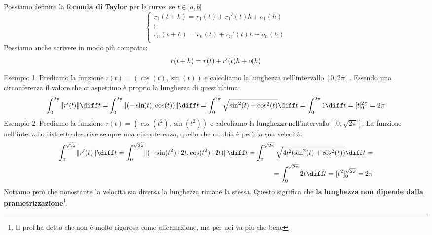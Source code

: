 
Possiamo definire la \textbf{formula di Taylor} per le curve: se $t \in ]a, b[$
\begin{equation*}
	\begin{cases}
		r_1(t + h) = r_1(t) + r_1'(t)h + o_1(h)\\
		\vdots\\
		r_n(t + h) = r_n(t) + r_n'(t)h + o_n(h)\\
	\end{cases}
\end{equation*}
Possiamo anche scrivere in modo più compatto:
\begin{equation*}
	r(t + h) = r(t) + r'(t)h + o(h)\\
\end{equation*}

Esempio 1: Prediamo la funzione $r(t) = (\cos(t), \sin(t))$ e calcoliamo la lunghezza nell'intervallo $[0, 2\pi]$. Essendo una circonferenza il valore che ci aspettimo è proprio la lunghezza di quest'ultima:
\begin{equation*}
	\int_0^{2\pi} \lVert r'(t) \rVert \diff t = \int_0^{2\pi} \lVert (-\sin(t), \cos(t)) \rVert \diff t = \int_0^{2\pi} \sqrt{\sin^2(t) + \cos^2(t)} \diff t = \int_0^{2\pi} 1 \diff t =  [t]_0^{2\pi} = 2\pi
\end{equation*}
Esempio 2: Prediamo la funzione $r(t) = (\cos(t^2), \sin(t^2))$ e calcoliamo la lunghezza nell'intervallo $[0, \sqrt{2\pi}]$. La funzione nell'intervallo ristretto descrive sempre una circonferenza, quello che cambia è però la sua velocità:
\begin{align*}
	\int_0^{\sqrt{2\pi}} \lVert r'(t) \rVert \diff t = \int_0^{\sqrt{2\pi}} \lVert (-\sin(t^2) \cdot 2t, \cos(t^2) \cdot 2t) \rVert \diff t = \int_0^{\sqrt{2\pi}} \sqrt{4t^2(\sin^2(t) + \cos^2(t))} \diff t = \\
	= \int_0^{\sqrt{2\pi}} 2t \diff t =  [t^2]_0^{\sqrt{2\pi}} = 2\pi
\end{align*}
Notiamo però che nonostante la velocita sia diversa la lunghezza rimane la stessa. Questo significa che \textbf{la lunghezza non dipende dalla prametrizzazione}\footnote{Il prof ha detto che non è molto rigorosa come affermazione, ma per noi va più che bene}.

